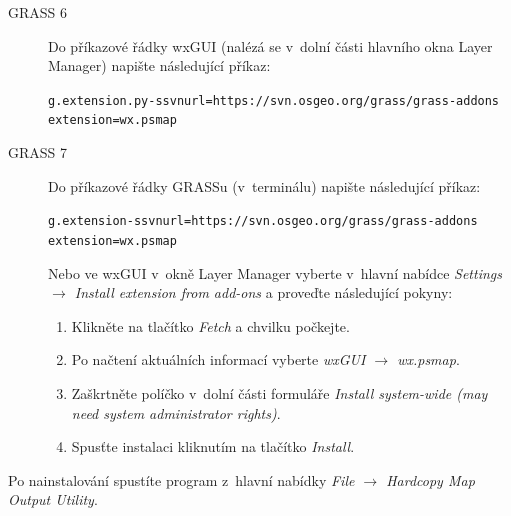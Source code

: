 \documentclass[a4paper,12pt,draft]{article}
\begin{document}
\begin{description}
\item[GRASS 6]
Do příkazové řádky wxGUI (nalézá se v~dolní části hlavního okna Layer Manager)
napište následující příkaz:

\begin{alltt}
g.extension.py -s svnurl=https://svn.osgeo.org/grass/grass-addons
extension=wx.psmap
\end{alltt}

\item[GRASS 7]
Do příkazové řádky GRASSu (v~terminálu) napište následující příkaz:

\begin{alltt}
g.extension -s svnurl=https://svn.osgeo.org/grass/grass-addons
extension=wx.psmap
\end{alltt}

Nebo ve wxGUI v~okně Layer Manager vyberte v~hlavní nabídce
\emph{Settings $\rightarrow$ Install extension from add-ons} a proveďte
následující pokyny:
\begin{enumerate}
\item   Klikněte na tlačítko \emph{Fetch} a chvilku počkejte.
\item Po načtení aktuálních informací vyberte \emph{wxGUI $\rightarrow$ wx.psmap}.
\item Zaškrtněte políčko v~dolní části formuláře \emph{Install system-wide (may need system administrator rights)}.
\item Spusťte instalaci kliknutím na tlačítko \emph{Install}.
\end{enumerate}

\end{description}

Po nainstalování spustíte program z~hlavní nabídky \emph{File $\rightarrow$ Hardcopy Map Output Utility}.
\fi

\newpage
\end{document}
